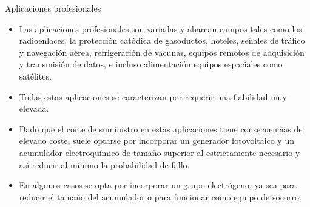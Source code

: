 \documentclass[xcolor={usenames,svgnames,dvipsnames}]{beamer}
\begin{document}
\begin{frame}[label={sec:org1b96b91}]{Aplicaciones profesionales}
\begin{itemize}
\item Las aplicaciones profesionales son variadas y abarcan campos tales
como los radioenlaces, la protección catódica de gasoductos,
hoteles, señales de tráfico y navegación aérea, refrigeración de
vacunas, equipos remotos de adquisición y transmisión de datos, e
incluso alimentación equipos espaciales como satélites.

\item Todas estas aplicaciones se caracterizan por requerir una fiabilidad
muy elevada.

\item Dado que el corte de suministro en estas aplicaciones tiene
consecuencias de elevado coste, suele optarse por incorporar un
generador fotovoltaico y un acumulador electroquímico de tamaño
superior al estrictamente necesario y así reducir al mínimo la
probabilidad de fallo.

\item En algunos casos se opta por incorporar un grupo electrógeno, ya sea
para reducir el tamaño del acumulador o para funcionar como equipo
de socorro.
\end{itemize}
\end{frame}
\end{document}
